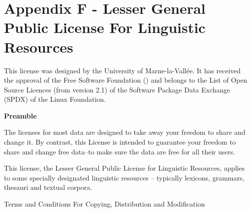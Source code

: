 \chapter*{Appendix F - Lesser General Public License For Linguistic Resources}
\noindent
This license was designed by the University of Marne-la-Vall\'ee. It has
received the approval of the Free Software Foundation (\cite{FSF}) and belongs to
the List of Open Source Licences (from version 2.1) of the
Software Package Data Exchange (SPDX) of the Linux Foundation.

\bigskip

\bigskip

\begin{center}
{\bf\large Preamble}
\end{center}

The licenses for most data are designed to take away your freedom to share and change it. 
By contrast, this License is intended to guarantee your freedom to share and change free 
data--to make sure the data are free for all their users.

This license, the Lesser General Public License for Linguistic Resources, applies to some 
specially designated linguistic resources -- typically lexicons, grammars, thesauri and 
textual corpora.

\begin{center}
{\Large \sc Terms and Conditions For Copying, Distribution and Modification}
\end{center}


